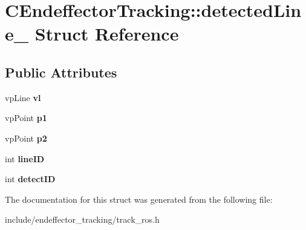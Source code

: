 \hypertarget{structCEndeffectorTracking_1_1detectedLine__}{\section{\-C\-Endeffector\-Tracking\-:\-:detected\-Line\-\_\- \-Struct \-Reference}
\label{structCEndeffectorTracking_1_1detectedLine__}
}
\subsection*{\-Public \-Attributes}
\begin{DoxyCompactItemize}
\item 
\hypertarget{structCEndeffectorTracking_1_1detectedLine___a043c9bb0f886ebfe8dc887269e39ca0f}{vp\-Line {\bfseries vl}}\label{structCEndeffectorTracking_1_1detectedLine___a043c9bb0f886ebfe8dc887269e39ca0f}

\item 
\hypertarget{structCEndeffectorTracking_1_1detectedLine___a5afdad4942193afcaeee4b2be3eca8a9}{vp\-Point {\bfseries p1}}\label{structCEndeffectorTracking_1_1detectedLine___a5afdad4942193afcaeee4b2be3eca8a9}

\item 
\hypertarget{structCEndeffectorTracking_1_1detectedLine___af881160558d0312c3bc0cf7f1706e975}{vp\-Point {\bfseries p2}}\label{structCEndeffectorTracking_1_1detectedLine___af881160558d0312c3bc0cf7f1706e975}

\item 
\hypertarget{structCEndeffectorTracking_1_1detectedLine___a960f5514b99d3af1a2eeaa7def4b1db2}{int {\bfseries line\-I\-D}}\label{structCEndeffectorTracking_1_1detectedLine___a960f5514b99d3af1a2eeaa7def4b1db2}

\item 
\hypertarget{structCEndeffectorTracking_1_1detectedLine___a1376c2e053538a541489923708e3f8cf}{int {\bfseries detect\-I\-D}}\label{structCEndeffectorTracking_1_1detectedLine___a1376c2e053538a541489923708e3f8cf}

\end{DoxyCompactItemize}


\-The documentation for this struct was generated from the following file\-:\begin{DoxyCompactItemize}
\item 
include/endeffector\-\_\-tracking/track\-\_\-ros.\-h\end{DoxyCompactItemize}
